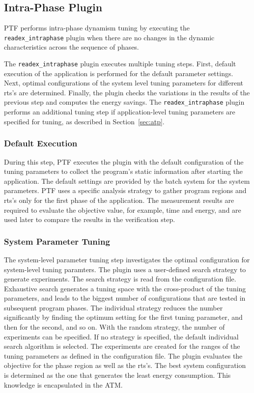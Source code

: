 \subsection{Intra-Phase Plugin} \label{sec:intra-phase}

PTF performs intra-phase dynamism tuning by executing the \texttt{readex\_intraphase} plugin when there are no changes in the dynamic characteristics across the sequence of phases.  

The \texttt{readex\_intraphase} plugin executes multiple tuning steps. First, default execution of the application is performed for the default parameter settings. Next, optimal configurations of the system level tuning parameters for different rts's are determined. Finally, the plugin checks the variations in the results of the previous step and computes the energy savings. The \texttt{readex\_intraphase} plugin performs an additional tuning step if application-level tuning parameters are specified for tuning, as described in Section~\ref{sec:atp}.

\subsubsection{Default Execution} \label{intra-default-execution} 

During this step, PTF executes the plugin with the default configuration of the tuning parameters to collect the program's static information after starting the application. The default settings are provided by the batch system for the system parameters. PTF uses a specific analysis strategy to gather program regions and rts's only for the first phase of the application. The measurement results are required to evaluate the objective value, for example, time and energy, and are used later to compare the results in the verification step.

\subsubsection{System Parameter Tuning} \label{sys-tuning} 

The system-level parameter tuning step investigates the optimal configuration for system-level tuning paramters. The plugin uses a user-defined search strategy to generate experiments. The search strategy is read from the configuration file. Exhaustive search generates a tuning space with the cross-product of the tuning parameters, and leads to the biggest number of configurations that are tested in subsequent program phases. The individual strategy reduces the number significantly by finding the optimum setting for the first tuning parameter, and then for the second, and so on. With the random strategy, the number of experiments can be specified. If no strategy is specified, the default individual search algorithm is selected. The experiments are created for the ranges of the tuning parameters as defined in the configuration file. The plugin evaluates the objective for the phase region as well as the rts's. The best system configuration is determined as the one that generates the least energy consumption. This knowledge is encapsulated in the ATM. 

